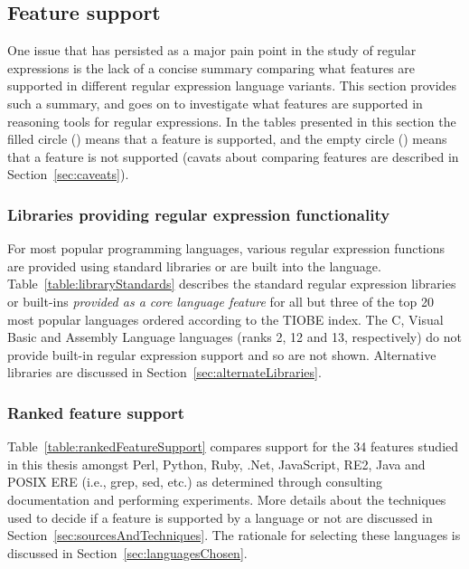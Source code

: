 \subsection{Feature support}
\label{sec:featureSupport}




One issue that has persisted as a major pain point in the study of regular expressions is the lack of a concise summary comparing what features are supported in different regular expression language variants.  This section provides such a summary, and goes on to investigate what features are supported in reasoning tools for regular expressions.  In the tables presented in this section the filled circle (\yes) means that a feature is supported, and the empty circle (\no) means that a feature is not supported (cavats about comparing features are described in Section~\ref{sec:caveats}).

\subsubsection{Libraries providing regular expression functionality}
For most popular programming languages, various regular expression functions are provided using standard libraries or are built into the language.  Table~\ref{table:libraryStandards} describes the standard regular expression libraries or built-ins \emph{provided as a core language feature} for all but three of the top 20 most popular languages ordered according to the TIOBE index. The C, Visual Basic and Assembly Language languages (ranks 2, 12 and 13, respectively) do not provide built-in regular expression support and so are not shown.  Alternative libraries are discussed in Section~\ref{sec:alternateLibraries}.





\afterpage{\clearpage}

\subsubsection{Ranked feature support}
Table~\ref{table:rankedFeatureSupport} compares support for the 34 features studied in this thesis amongst Perl, Python, Ruby, .Net, JavaScript, RE2, Java and POSIX ERE (i.e., grep, sed, etc.) as determined through consulting documentation and performing experiments.  More details about the techniques used to decide if a feature is supported by a language or not are discussed in Section~\ref{sec:sourcesAndTechniques}.  The rationale for selecting these languages is discussed in Section~\ref{sec:languagesChosen}.

